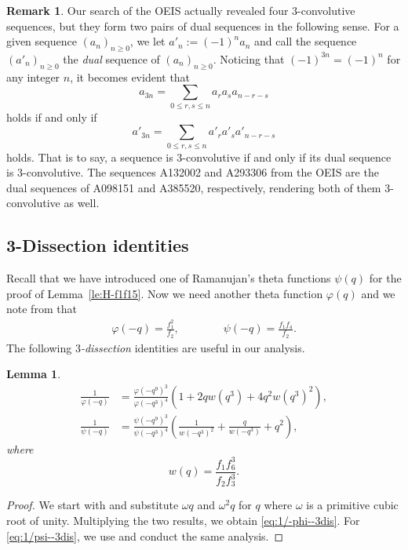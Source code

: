 \documentclass[12pt,reqno]{amsart}
\numberwithin{equation}{section}
\theoremstyle{plain}
\newtheorem{lemma}[theorem]{Lemma}
\theoremstyle{definition}
\newtheorem{remark}[theorem]{Remark}
\theoremstyle{named}
\begin{document}
\begin{remark}
    Our search of the OEIS actually revealed four $3$-convolutive sequences, but they form two pairs of dual sequences in the following sense. For a given sequence $(a_n)_{n\ge 0}$, we let $a'_n:=(-1)^na_n$ and call the sequence $(a'_n)_{n\ge 0}$ the \emph{dual} sequence of $(a_n)_{n\ge 0}$. Noticing that $(-1)^{3n}=(-1)^n$ for any integer $n$, it becomes evident that
    $$a_{3n}=\sum_{0\le r,s\le n}a_ra_sa_{n-r-s}$$
    holds if and only if
    $$a'_{3n}=\sum_{0\le r,s\le n}a'_ra'_sa'_{n-r-s}$$
    holds. That is to say, a sequence is $3$-convolutive if and only if its dual sequence is $3$-convolutive. The sequences A132002 and A293306 from the OEIS are the dual sequences of A098151 and A385520, respectively, rendering both of them $3$-convolutive as well.
\end{remark}

\subsection{3-Dissection identities}

Recall that we have introduced one of Ramanujan's theta functions $\psi(q)$ for the proof of Lemma~\ref{le:H-f1f15}. Now we need another theta function $\varphi(q)$ and we note from \cite[eqs.~(1.5.8) and (1.5.9)]{Hir} that
\begin{align*}
	\varphi(-q) = \frac{f_1^2}{f_2},\qquad\qquad \psi(-q) = \frac{f_1 f_4}{f_2}.
\end{align*}
The following \emph{$3$-dissection} identities are useful in our analysis.

\begin{lemma}
	\begin{align}
		\frac{1}{\varphi(-q)}&=\frac{\varphi(-q^9)^3}{\varphi(-q^3)^4}\left(1+2qw(q^3)+4q^2 w(q^3)^2\right),\label{eq:1/-phi--3dis}\\
		\frac{1}{\psi(-q)}&=\frac{\psi(-q^9)^3}{\psi(-q^3)^4}\left(\frac{1}{w(-q^3)^2}+\frac{q}{w(-q^3)}+q^2\right)\label{eq:1/psi--3dis},
	\end{align}
	where
	\begin{equation}
		w(q)=\frac{f_1f_6^3}{f_2f_3^3}.\label{def:w(q)}
	\end{equation}
\end{lemma}

\begin{proof}
	We start with \cite[eq.~(14.3.4)]{Hir} and substitute $\omega q$ and $\omega^2 q$ for $q$ where $\omega$ is a primitive cubic root of unity. Multiplying the two results, we obtain \eqref{eq:1/-phi--3dis}. For \eqref{eq:1/psi--3dis}, we use \cite[eq.~(14.3.5)]{Hir} and conduct the same analysis.
\end{proof}
\end{document}
